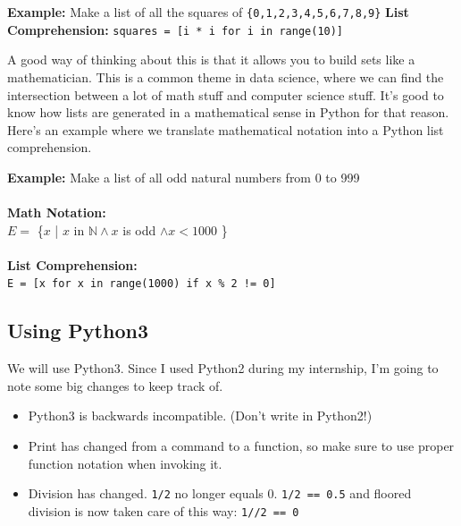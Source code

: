 \documentclass[english, 10pt]{article}
\begin{document}
\begin{myproof}
\textbf{Example:} Make a list of all the squares of \texttt{\{0,1,2,3,4,5,6,7,8,9\}}\newline\newline
\textbf{List Comprehension:}\newline
\texttt{squares = [i * i for i in range(10)]}
\end{myproof}

A good way of thinking about this is that it allows you to build sets like a mathematician. This is a common theme in data science, where we can find the intersection between a lot of math stuff and computer science stuff. It's good to know how lists are generated in a mathematical sense in Python for that reason. Here's an example where we translate mathematical notation into a Python list comprehension.\\

\begin{myproof}
\textbf{Example:} Make a list of all odd natural numbers from 0 to 999\\\\
\textbf{Math Notation:}\\ $E =$ \{$x$ | $x$ in $\mathbb{N} \land x$ is odd $\land x<1000$ \}\\\\
\textbf{List Comprehension:}\\
\texttt{E = [x for x in range(1000) if x \% 2 != 0]}
\end{myproof}

\subsection{Using Python3}

We will use Python3. Since I used Python2 during my internship, I'm going to note some big changes to keep track of.\\

\begin{itemize}
	\item Python3 is backwards incompatible. (Don't write in Python2!)
	\item Print has changed from a command to a function, so make sure to use proper function notation when invoking it.
	\item Division has changed. \texttt{1/2} no longer equals 0. \texttt{1/2 == 0.5} and floored division is now taken care of this way: \texttt{1//2 == 0}
\end{itemize}
\end{document}
